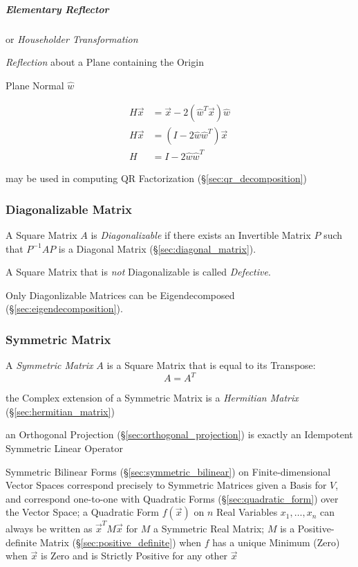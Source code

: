 \subparagraph{Elementary Reflector}\label{sec:elementary_reflector}\hfill

or \emph{Householder Transformation}

\emph{Reflection} about a Plane containing the Origin

Plane Normal $\hat{w}$

\begin{align*}
  H\vec{x} & = \vec{x} - 2(\hat{w}^T\vec{x})\hat{w} \\
  H\vec{x} & = (I - 2\hat{w}\hat{w}^T)\vec{x}       \\
         H & = I - 2\hat{w}\hat{w}^T
\end{align*}

\fist may be used in computing QR Factorization (\S\ref{sec:qr_decomposition})



\subsubsection{Diagonalizable Matrix}\label{sec:diagonalizable_matrix}

A Square Matrix $A$ is \emph{Diagonalizable} if there exists an Invertible
Matrix $P$ such that $P^{-1}AP$ is a Diagonal Matrix
(\S\ref{sec:diagonal_matrix}).

A Square Matrix that is \emph{not} Diagonalizable is called \emph{Defective}.

Only Diagonlizable Matrices can be Eigendecomposed
(\S\ref{sec:eigendecomposition}).



\subsubsection{Symmetric Matrix}\label{sec:symmetric_matrix}

A \emph{Symmetric Matrix} $A$ is a Square Matrix that is equal to its
Transpose:
\[
  A = A^T
\]

the Complex extension of a Symmetric Matrix is a \emph{Hermitian Matrix}
(\S\ref{sec:hermitian_matrix})

an Orthogonal Projection (\S\ref{sec:orthogonal_projection}) is exactly an
Idempotent Symmetric Linear Operator

Symmetric Bilinear Forms (\S\ref{sec:symmetric_bilinear}) on
Finite-dimensional Vector Spaces correspond precisely to Symmetric Matrices
given a Basis for $V$, and correspond one-to-one with Quadratic Forms
(\S\ref{sec:quadratic_form}) over the Vector Space;
a Quadratic Form $f(\vec{x})$ on $n$ Real Variables $x_1,\ldots,x_n$ can always
be written as $\vec{x}^T M \vec{x}$ for $M$ a Symmetric Real Matrix; $M$ is a
Positive-definite Matrix (\S\ref{sec:positive_definite}) when $f$ has a unique
Minimum (Zero) when $\vec{x}$ is Zero and is Strictly Positive for any other
$\vec{x}$

